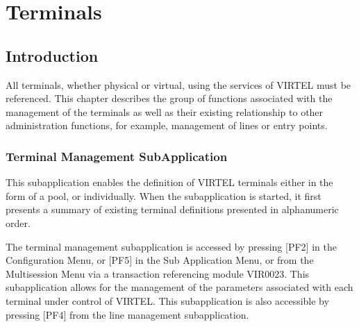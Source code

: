\documentclass[letterpaper,10pt,english]{sphinxmanual}
\begin{document}
\ignorespaces 

\chapter{Terminals}
\label{\detokenize{connectivity_guide:terminals}}\label{\detokenize{connectivity_guide:index-97}}

\section{Introduction}
\label{\detokenize{connectivity_guide:id50}}
\sphinxAtStartPar
All terminals, whether physical or virtual, using the services of VIRTEL must be referenced. This chapter describes the group of functions associated with the management of the terminals as well as their existing relationship to other administration functions, for example, management of lines or entry points.

\ignorespaces 

\subsection{Terminal Management Sub\sphinxhyphen{}Application}
\label{\detokenize{connectivity_guide:terminal-management-sub-application}}\label{\detokenize{connectivity_guide:index-98}}
\sphinxAtStartPar
This sub\sphinxhyphen{}application enables the definition of VIRTEL terminals either in the form of a pool, or individually. When the sub\sphinxhyphen{}application is started, it first presents a summary of existing terminal definitions presented in alphanumeric order.

\sphinxAtStartPar
The terminal management sub\sphinxhyphen{}application is accessed by pressing {[}PF2{]} in the Configuration Menu, or {[}PF5{]} in the Sub Application Menu, or from the Multi\sphinxhyphen{}session Menu via a transaction referencing module VIR0023. This sub\sphinxhyphen{}application allows for the management of the parameters associated with each terminal under control of VIRTEL. This subapplication
is also accessible by pressing {[}PF4{]} from the line management sub\sphinxhyphen{}application.

\ignorespaces 
\end{document}
